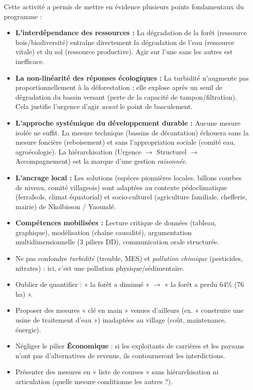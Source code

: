 \documentclass[11pt]{article}
\newcounter{popsec}
\newcounter{popsub}
\newcommand{\courssub}[1]{%
  \stepcounter{popsub}%
  \par\vspace{9pt}\noindent{\popxbold\fontsize{11.5}{13}\selectfont\color{popink}{\color{poporange}\thepopsec.\thepopsub}\hspace{6pt}#1}\par\nopagebreak\vspace{4pt}
}
\begin{document}
\courssub{Bilan de l'activité}
Cette activité a permis de mettre en évidence plusieurs points fondamentaux du programme :
\begin{itemize}
    \item \textbf{L'interdépendance des ressources :} La dégradation de la forêt (ressource bois/biodiversité) entraîne directement la dégradation de l'eau (ressource vitale) et du sol (ressource productive). Agir sur l'une sans les autres est inefficace.
    \item \textbf{La non-linéarité des réponses écologiques :} La turbidité n'augmente pas proportionnellement à la déforestation ; elle explose après un seuil de dégradation du bassin versant (perte de la capacité de tampon/filtration). Cela justifie l'urgence d'agir \emph{avant} le point de basculement.
    \item \textbf{L'approche systémique du développement durable :} Aucune mesure isolée ne suffit. La mesure technique (bassins de décantation) échouera sans la mesure foncière (reboisement) et sans l'appropriation sociale (comité eau, agroécologie). La hiérarchisation (Urgence $\rightarrow$ Structurel $\rightarrow$ Accompagnement) est la marque d'une gestion \emph{raisonnée}.
    \item \textbf{L'ancrage local :} Les solutions (espèces pionnières locales, billons courbes de niveau, comité villageois) sont adaptées au contexte pédoclimatique (ferralsols, climat équatorial) et socio-culturel (agriculture familiale, chefferie, mairie) de Nkolbisson / Yaoundé.
    \item \textbf{Compétences mobilisées :} Lecture critique de données (tableau, graphique), modélisation (chaîne causalité), argumentation multidimensionnelle (3 piliers DD), communication orale structurée.
\end{itemize}

\begin{attention}
\begin{itemize}
\item Ne pas confondre \emph{turbidité} (trouble, MES) et \emph{pollution chimique} (pesticides, nitrates) : ici, c'est une pollution physique/sédimentaire.
\item Oublier de quantifier : « la forêt a diminué » $\rightarrow$ « la forêt a perdu 64\% (76 ha) ».
\item Proposer des mesures « clé en main » venues d'ailleurs (ex. « construire une usine de traitement d'eau ») inadaptées au village (coût, maintenance, énergie).
\item Négliger le pilier \textbf{Économique} : si les exploitants de carrières et les paysans n'ont pas d'alternatives de revenus, ils contourneront les interdictions.
\item Présenter des mesures en « liste de courses » sans hiérarchisation ni articulation (quelle mesure conditionne les autres ?).
\end{itemize}
\end{attention}
\end{document}
